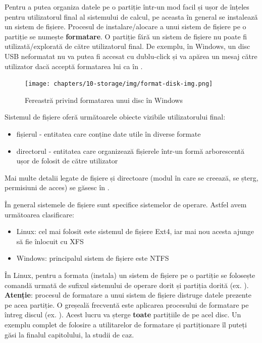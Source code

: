Pentru a putea organiza datele pe o partiție într-un mod facil și ușor de
înțeles pentru utilizatorul final al sistemului de calcul, pe aceasta în general
se instalează un sistem de fișiere. Procesul de instalare/alocare a unui sistem
de fișiere pe o partiție se numește \textbf{formatare}. O partiție fără un sistem de
fișiere nu poate fi utilizată/explorată de către utilizatorul final. De exemplu,
în Windows, un disc USB neformatat nu va putea fi accesat cu dublu-click și va
apărea un mesaj către utilizator dacă acceptă formatarea lui ca în
.

\begin{figure}[!htbp]
  \centering
  \texttt{[image: chapters/10-storage/img/format-disk-img.png]}
  \caption{Fereastră privind formatarea unui disc în Windows}
  \label{fig:storage:format-disk}
\end{figure}

Sistemul de fișiere oferă următoarele obiecte vizibile utilizatorului final:

\begin{itemize}
  \item fișierul - entitatea care conține date utile în diverse formate
  \item directorul - entitatea care organizează fișierele într-un formă
    arborescentă ușor de folosit de către utilizator
\end{itemize}

Mai multe detalii legate de fișiere și directoare (modul în care se creează, se
șterg, permisiuni de acces) se găsesc în
.

În general sistemele de fișiere sunt specifice sistemelor de operare. Astfel avem următoarea clasificare:

\begin{itemize}
  \item Linux: cel mai folosit este sistemul de fișiere Ext4, iar mai nou
    acesta ajunge să fie înlocuit cu XFS
  \item Windows: principalul sistem de fișiere este NTFS
\end{itemize}

În Linux, pentru a formata (instala) un sistem de fișiere pe o partiție se
folosește comandă  urmată de sufixul sistemului de operare dorit și
partiția dorită (ex. ). \textbf{Atenție}: procesul de
formatare a unui sistem de fișiere distruge datele prezente pe acea partiție. O
greșeală frecventă este aplicarea procesului de formatare pe întreg discul (ex.
). Acest lucru va șterge \textbf{toate} partițiile de pe
acel disc. Un exemplu complet de folosire a utilitarelor de formatare și
partiționare îl puteți găsi la finalul capitolului, la studii de caz.


